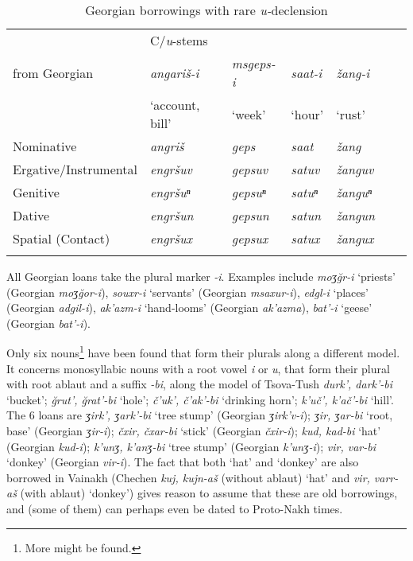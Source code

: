 \begin{table}
	\begin{tabular}{lllllll}
    \lsptoprule
		& {C/\textit{u}-stems}  & &  & \\
		from Georgian & \textit{angariš-i}  & \textit{msgeps-i} & \textit{saat-i}  & \textit{žang-i}  \\
		              &  `account, bill' &    `week' &  `hour' & `rust'  \\
		\midrule
		
		Nominative & \textit{angriš} & \textit{geps} & \textit{saat} & \textit{žang} \\
		
		Ergative/Instrumental & \textit{engršuv} & \textit{gepsuv} & \textit{satuv} & \textit{žanguv} \\
		
		Genitive & \textit{engršuⁿ} & \textit{gepsuⁿ} & \textit{satuⁿ} & \textit{žanguⁿ} \\
		
		Dative & \textit{engršun} & \textit{gepsun} & \textit{satun} & \textit{žangun} \\
		
		Spatial (Contact) & \textit{engršux} & \textit{gepsux} & \textit{satux} & \textit{žangux} \\
        \lspbottomrule
	\end{tabular}
	\caption{Georgian borrowings with rare \textit{u-}declension}
	\label{table-custemsgeo}
\end{table}

All Georgian loans take the plural marker \textit{-i}. Examples include \textit{moʒ\u{g}r-i} `priests' (Georgian \textit{moʒ\u{g}or-i}), \textit{souxr-i} `servants' (Georgian \textit{msaxur-i}), \textit{edgl-i} `places' (Georgian \textit{adgil-i}), \textit{ak'azm-i} `hand-looms' (Georgian \textit{ak'azma}), \textit{bat'-i} `geese' (Georgian \textit{bat'-i}).\largerpage[-1]\pagebreak

Only six nouns\footnote{More might be found.} have been found that form their plurals along a different model. It concerns monosyllabic nouns with a root vowel \textit{i} or \textit{u}, that form their plural with root ablaut and a suffix \textit{-bi}, along the model of Tsova-Tush \textit{durk', dark'-bi} `bucket'; \textit{\u{g}rut', \u{g}rat'-bi} `hole'; \textit{č'uk', č'ak'-bi} `drinking horn'; \textit{k'uč', k'ač'-bi} `hill'. The 6 loans are \textit{ʒirk', ʒark'-bi} `tree stump' (Georgian \textit{ʒirk'v-i}); \textit{ʒir, ʒar-bi} `root, base' (Georgian \textit{ʒir-i}); \textit{čxir, čxar-bi} `stick' (Georgian \textit{čxir-i}); \textit{kud, kad-bi} `hat' (Georgian \textit{kud-i}); \textit{k'unʒ, k'anʒ-bi} `tree stump' (Georgian \textit{k'unʒ-i}); \textit{vir, var-bi} `donkey' (Georgian \textit{vir-i}). The fact that both `hat' and `donkey' are also borrowed in Vainakh (Chechen \textit{kuj, kujn-aš} (without ablaut) `hat' and \textit{vir, varr-aš} (with ablaut) `donkey') gives reason to assume that these are old borrowings, and (some of them) can perhaps even be dated to Proto-Nakh times.\largerpage[-1]

